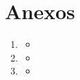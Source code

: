 \documentclass{article}
\begin{document}
    \section*{Anexos}
        \begin{enumerate}
            \item
            \begin{itemize}
                \item 
            \end{itemize}
            \item
            \begin{itemize}
                \item 
            \end{itemize}
            \item 
            \begin{itemize}
                \item 
            \end{itemize}
        \end{enumerate}
\end{document}
